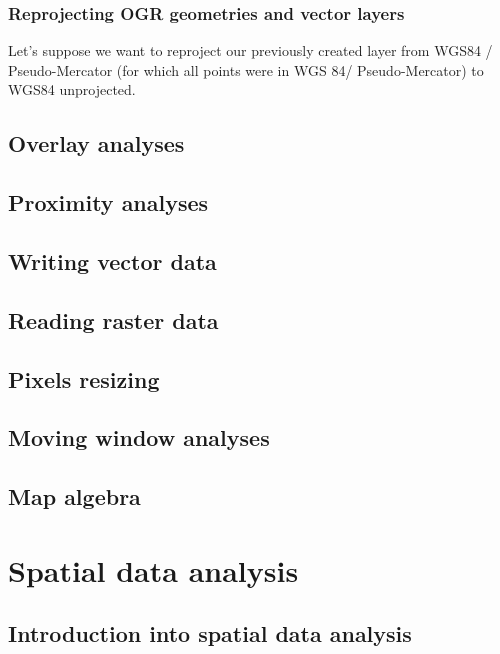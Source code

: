 \documentclass {article}
\begin{document}
\subsubsection {Reprojecting OGR geometries and vector layers} 

Let's suppose we want to reproject our previously created layer from WGS84 / Pseudo-Mercator (for which all points were in WGS 84/ Pseudo-Mercator) to WGS84 unprojected.  

\subsection {Overlay analyses}

\subsection {Proximity analyses}

\subsection {Writing vector data}

\subsection {Reading raster data}

\subsection {Pixels resizing}

\subsection {Moving window analyses}

\subsection {Map algebra}



\section {Spatial data analysis}
\subsection{Introduction into spatial data analysis}
\end{document}
